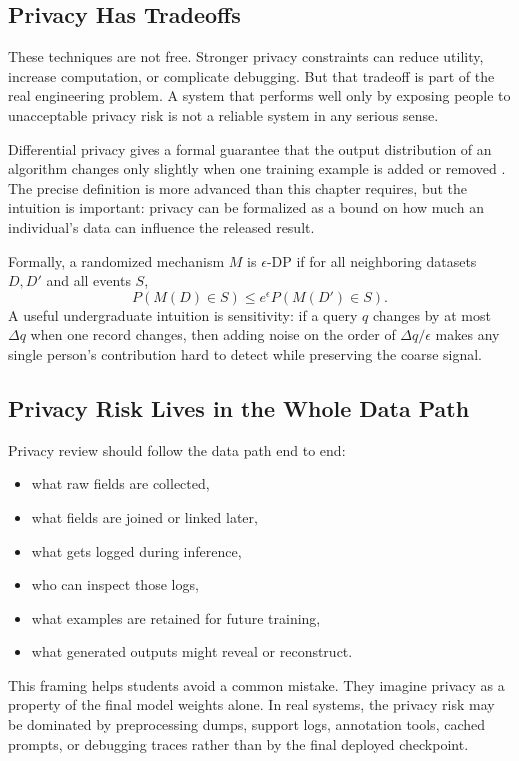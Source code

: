 \subsection{Privacy Has Tradeoffs}

These techniques are not free. Stronger privacy constraints can reduce utility, increase computation, or complicate debugging. But that tradeoff is part of the real engineering problem. A system that performs well only by exposing people to unacceptable privacy risk is not a reliable system in any serious sense.

\begin{advancednote}
Differential privacy gives a formal guarantee that the output distribution of an algorithm changes only slightly when one training example is added or removed \citep{dwork2006}. The precise definition is more advanced than this chapter requires, but the intuition is important: privacy can be formalized as a bound on how much an individual's data can influence the released result.

Formally, a randomized mechanism $M$ is $\epsilon$-DP if for all neighboring datasets $D,D'$ and all events $S$,
\[
P(M(D)\in S)\le e^\epsilon P(M(D')\in S).
\]
A useful undergraduate intuition is sensitivity: if a query $q$ changes by at most $\Delta q$ when one record changes, then adding noise on the order of $\Delta q/\epsilon$ makes any single person's contribution hard to detect while preserving the coarse signal.
\end{advancednote}

\subsection{Privacy Risk Lives in the Whole Data Path}

Privacy review should follow the data path end to end:
\begin{itemize}[leftmargin=*]
\item what raw fields are collected,
\item what fields are joined or linked later,
\item what gets logged during inference,
\item who can inspect those logs,
\item what examples are retained for future training,
\item what generated outputs might reveal or reconstruct.
\end{itemize}

This framing helps students avoid a common mistake. They imagine privacy as a property of the final model weights alone. In real systems, the privacy risk may be dominated by preprocessing dumps, support logs, annotation tools, cached prompts, or debugging traces rather than by the final deployed checkpoint.

